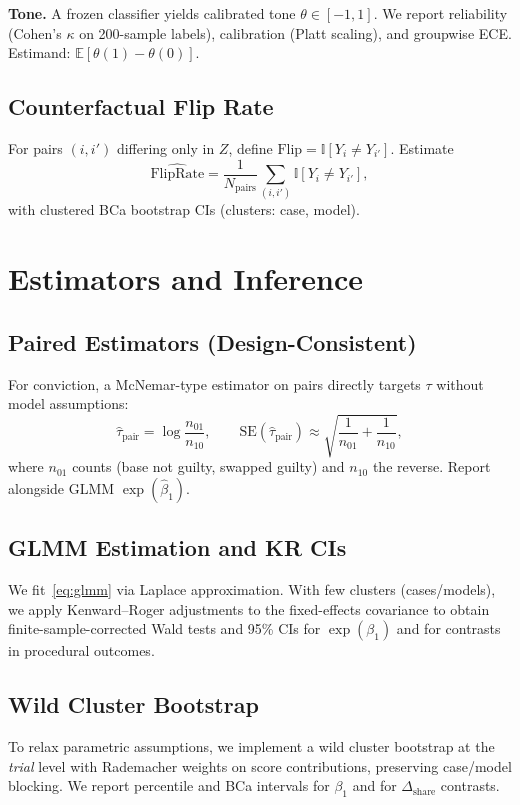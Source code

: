 \documentclass[conference]{IEEEtran}
\begin{document}
\textbf{Tone.} A frozen classifier yields calibrated tone $\theta\in[-1,1]$. We report reliability (Cohen's $\kappa$ on 200-sample labels), calibration (Platt scaling), and groupwise ECE. Estimand: $\mathbb{E}[\theta(1)-\theta(0)]$.

\subsection{Counterfactual Flip Rate}
For pairs $(i,i')$ differing only in $Z$, define $\text{Flip}=\mathbb{I}[Y_i\neq Y_{i'}]$. Estimate
\begin{equation}
\widehat{\mathrm{FlipRate}} = \frac{1}{N_{\text{pairs}}}\sum_{(i,i')} \mathbb{I}[Y_i\neq Y_{i'}],
\label{eq:flip}
\end{equation}
with clustered BCa bootstrap CIs (clusters: case, model).

\section{Estimators and Inference}
\label{sec:estimators}

\subsection{Paired Estimators (Design-Consistent)}
For conviction, a McNemar-type estimator on pairs directly targets $\tau$ without model assumptions:
\begin{equation}
\widehat{\tau}_{\text{pair}} = \log\frac{n_{01}}{n_{10}},
\qquad
\text{SE}(\widehat{\tau}_{\text{pair}}) \approx \sqrt{\frac{1}{n_{01}}+\frac{1}{n_{10}} },
\label{eq:mcnemar}
\end{equation}
where $n_{01}$ counts (base not guilty, swapped guilty) and $n_{10}$ the reverse. Report alongside GLMM $\exp(\hat{\beta}_1)$.

\subsection{GLMM Estimation and KR CIs}
\label{sec:inference}
We fit~\eqref{eq:glmm} via Laplace approximation. With few clusters (cases/models), we apply Kenward--Roger adjustments to the fixed-effects covariance to obtain finite-sample-corrected Wald tests and 95\% CIs for $\exp(\beta_1)$ and for contrasts in procedural outcomes.

\subsection{Wild Cluster Bootstrap}
To relax parametric assumptions, we implement a wild cluster bootstrap at the \emph{trial} level with Rademacher weights on score contributions, preserving case/model blocking. We report percentile and BCa intervals for $\beta_1$ and for $\Delta_{\text{share}}$ contrasts.
\end{document}
